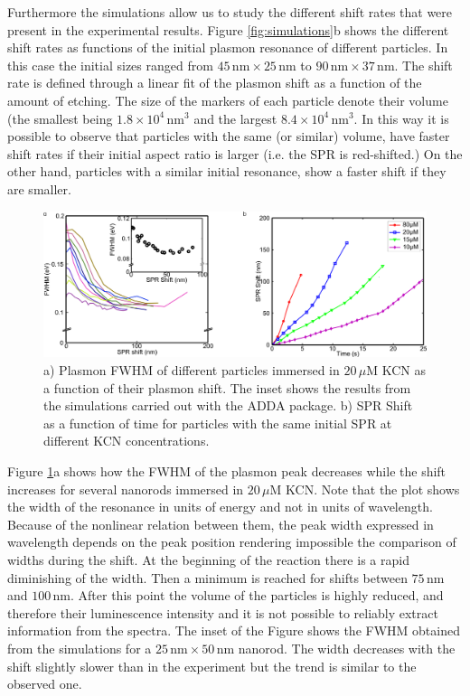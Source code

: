 \documentclass[a4paper,oneside,onecolumn]{article}
\newcommand{\nm}{\ensuremath{\,\textrm{nm}}}
\newcommand{\uM}{\ensuremath{\,\mu\textrm{M}}}
\begin{document}
Furthermore the simulations allow us to study the different shift rates that
were present in the experimental results. Figure \ref{fig:simulations}b shows the
different shift rates as functions of the initial plasmon resonance of different
particles. In this case the initial sizes ranged from $45\nm\times25\nm$ to
$90\nm\times37\nm$. The shift rate is defined through a linear fit of the
plasmon shift as a function of the amount of etching. The size of the markers of
each particle denote their volume (the smallest being $1.8\times10^4\nm^3$ and
the largest $8.4\times10^4\nm^3$. In this way it is possible to observe that
particles with the same (or similar) volume, have faster shift rates if their
initial aspect ratio is larger (i.e. the SPR is red-shifted.) On the other hand,
particles with a similar initial resonance, show a faster shift if they are
smaller. 

\begin{figure}[p]
 \centering
 \includegraphics[width=0.95\linewidth]{Figures/03_Shifts/shifts.png}
 \caption{a) Plasmon FWHM of different particles immersed in $20\uM$
 KCN as a function of their plasmon shift. The inset shows the results from the
 simulations carried out with the ADDA package. b) SPR Shift as a function of
 time for particles with the same initial SPR at different KCN concentrations.}
 \label{fig:FWHM}
\end{figure}

Figure \ref{fig:FWHM}a shows how the FWHM of the plasmon peak decreases while
the shift increases for several nanorods immersed in $20\uM$ KCN. Note that the
plot shows the width of the resonance in units of energy and not in units of
wavelength. Because of the nonlinear relation between them, the peak width
expressed in wavelength depends on the peak position rendering impossible the
comparison of widths during the shift. At the beginning of the reaction there is
a rapid diminishing of the width. Then a minimum is reached for shifts between
$75\nm$ and $100\nm$. After this point the volume of the particles is highly
reduced, and therefore their luminescence intensity and it is not possible to
reliably extract information from the spectra. The inset of the Figure shows
the FWHM obtained from the simulations for a $25\nm\times50\nm$ nanorod. The
width decreases with the shift slightly slower than in the experiment but the
trend is similar to the observed one.
\end{document}
